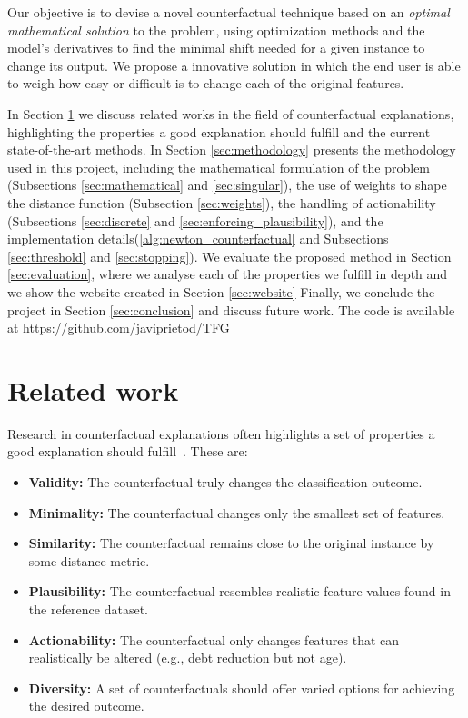 \documentclass[12pt]{extarticle}
\numberwithin{equation}{section}
\begin{document}
Our objective is to devise a novel counterfactual technique based on an \emph{optimal mathematical solution} to the problem, using optimization methods and the model's derivatives to find the minimal shift needed for a given instance to change its output. We propose a innovative solution in which the end user is able to weigh how easy or difficult is to change each of the original features.

In Section \ref{sec:related} we discuss related works in the field of counterfactual explanations, highlighting the properties a good explanation should fulfill and the current state-of-the-art methods. In Section \ref{sec:methodology} presents the methodology used in this project, including the mathematical formulation of the problem (Subsections \ref{sec:mathematical} and \ref{sec:singular}), the use of weights to shape the distance function (Subsection \ref{sec:weights}), the handling of actionability (Subsections \ref{sec:discrete} and \ref{sec:enforcing_plausibility}), and the implementation details(\autoref{alg:newton_counterfactual} and Subsections \ref{sec:threshold} and \ref{sec:stopping}). We evaluate the proposed method in Section \ref{sec:evaluation}, where we analyse each of the properties we fulfill in depth and we show the website created in Section \ref{sec:website}
Finally, we conclude the project in Section \ref{sec:conclusion} and discuss future work. The code is available at \url{https://github.com/javiprietod/TFG}

\section{Related work}\label{sec:related} 
Research in counterfactual explanations often highlights a set of properties a good explanation should fulfill~\cite{guidotti2024counterfactual}. These are:
\begin{itemize}
  \item \textbf{Validity:} The counterfactual truly changes the classification outcome.
  \item \textbf{Minimality:} The counterfactual changes only the smallest set of features.
  \item \textbf{Similarity:} The counterfactual remains close to the original instance by some distance metric.
  \item \textbf{Plausibility:} The counterfactual resembles realistic feature values found in the reference dataset.
  \item \textbf{Actionability:} The counterfactual only changes features that can realistically be altered (e.g., debt reduction but not age).
  \item \textbf{Diversity:} A set of counterfactuals should offer varied options for achieving the desired outcome.
\end{itemize}
\end{document}
